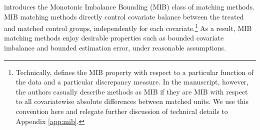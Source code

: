 \documentclass{article}
\begin{document}
\citet{iacus2011multivariate} introduces the Monotonic Imbalance Bounding (MIB) class of matching methods.
MIB matching methods directly control covariate balance between the treated and matched control groups, independently for each covariate.\footnote{Technically, \cite{iacus2011multivariate} defines the MIB property with respect to a particular function of the data and a particular discrepancy measure.
In the manuscript, however, the authors casually describe methods as MIB if they are MIB with respect to all covariatewise absolute differences between matched units.
We use this convention here and relegate further discussion of technical details to Appendix \ref{app:mib}.}
As a result, MIB matching methods enjoy desirable properties such as bounded covariate imbalance and bounded estimation error, under reasonable assumptions.
\end{document}
